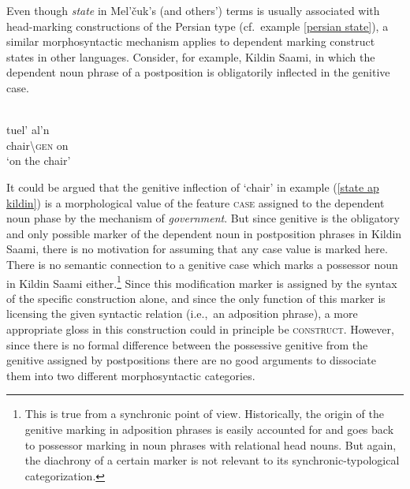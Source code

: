 Even though \emph{state} in Mel'čuk's (and others') terms is usually associated with head-marking constructions of the Persian type (cf.~example \ref{persian state}), a similar morphosyntactic mechanism applies to dependent marking construct states in other languages. Consider, for example, Kildin Saami, in which the dependent noun phrase of a postposition is obligatorily inflected in the genitive case.
\begin{exe}
\ex\label{state ap kildin} 
\\
\gll 	tuel'		al'n\\
	chair\textbackslash\textsc{gen}	on\\
\glt 	‘on the chair’
\end{exe}
It could be argued that the genitive inflection of ‘chair’ in example (\ref{state ap kildin}) is a morphological value of the feature \textsc{case} assigned to the dependent noun phase by the mechanism of \emph{government}. But since genitive is the obligatory and only possible marker of the dependent noun in postposition phrases in Kildin Saami, there is no motivation for assuming that any case value is marked here. There is no semantic connection to a genitive case which marks a possessor noun in Kildin Saami either.\footnote{This is true from a synchronic point of view. Historically, the origin of the genitive marking in adposition phrases is easily accounted for and goes back to possessor marking in noun phrases with relational head nouns. But again, the diachrony of a certain marker is not relevant to its synchronic-typological categorization.} Since this modification marker is assigned by the syntax of the specific construction alone, and since the only function of this marker is licensing the given syntactic relation (i.e.,~an adposition phrase), a more appropriate gloss in this construction could in principle be \textsc{construct}. However, since there is no formal difference between the possessive genitive from the genitive assigned by postpositions there are no good arguments to dissociate them into two different morphosyntactic categories.

